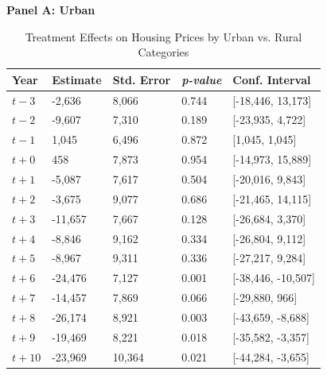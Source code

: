 \begin{table}[htbp]
    \centering
    \caption{Treatment Effects on Housing Prices by Urban vs. Rural Categories}
    \label{tab:urban_rural_results}
    \begin{threeparttable}
    \small
    \textbf{Panel A: Urban} \\[4pt]
    \begin{tabularx}{\textwidth}{l*{4}{X}}
    \hline
    \textbf{Year} & \textbf{Estimate} & \textbf{Std. Error} & \textbf{\textit{p-value}} & \textbf{Conf. Interval} \\
    \hline
    $t - 3$  & -2,636  & 8,066  & 0.744 & [-18,446, 13,173] \\
    $t - 2$  & -9,607  & 7,310  & 0.189 & [-23,935, 4,722] \\
    $t - 1$  & 1,045   & 6,496  & 0.872 & [1,045, 1,045] \\
    $t + 0$  & 458     & 7,873  & 0.954 & [-14,973, 15,889] \\
    $t + 1$  & -5,087  & 7,617  & 0.504 & [-20,016, 9,843] \\
    $t + 2$  & -3,675  & 9,077  & 0.686 & [-21,465, 14,115] \\
    $t + 3$  & -11,657 & 7,667  & 0.128 & [-26,684, 3,370] \\
    $t + 4$  & -8,846  & 9,162  & 0.334 & [-26,804, 9,112] \\
    $t + 5$  & -8,967  & 9,311  & 0.336 & [-27,217, 9,284] \\
    $t + 6$  & -24,476 & 7,127  & 0.001 & [-38,446, -10,507] \\
    $t + 7$  & -14,457 & 7,869  & 0.066 & [-29,880, 966] \\
    $t + 8$  & -26,174 & 8,921  & 0.003 & [-43,659, -8,688] \\
    $t + 9$  & -19,469 & 8,221  & 0.018 & [-35,582, -3,357] \\
    $t + 10$ & -23,969 & 10,364 & 0.021 & [-44,284, -3,655] \\
    \hline
    \end{tabularx}
    
    \vspace{8pt}
    

\end{threeparttable}
\end{table}
